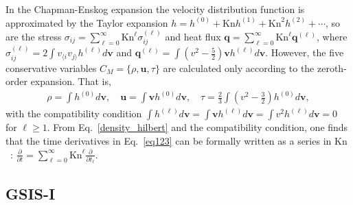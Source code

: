 \documentclass[onefignum,onetabnum]{siamart171218}
\begin{document}
In the Chapman-Enskog expansion the velocity distribution function is approximated by the Taylor expansion $h=h^{(0)}+\text{Kn}h^{(1)}+\text{Kn}^2h^{(2)}+\cdots$,
 so are the stress $\sigma_{ij} =\sum_{\ell=0}^\infty \text{Kn}^{\ell} \sigma_{ij}^{(\ell)}$ and heat flux $\bm{q} =\sum_{\ell=0}^\infty \text{Kn}^{\ell} \bm{q}^{(\ell)}$,
where $\sigma^{(\ell)}_{ij}=2\int{v_{\langle{i}}v_{j\rangle}h^{(\ell)}}d\bm{v}$ and
$\bm{q}^{(\ell)}=\int\left({v^2}-\frac{5}{2}\right)\bm{v}h^{(\ell)}d\bm{v}$. However, the five conservative variables $C_M=\{\rho,\bm{u}, \tau\}$  are calculated only according to the zeroth-order expansion. That is, 
\begin{eqnarray}\label{density_hilbert}
\rho=\int{}h^{(0)}d\bm{v}, \quad \bm{u}=\int{}\bm{v}h^{(0)}d\bm{v}, \quad \tau=\frac{2}{3}\int{}\left(v^2-\frac{3}{2}\right)h^{(0)}d\bm{v},
\end{eqnarray}
with the compatibility condition  $\int{}h^{(\ell)}d\bm{v}=\int{}\bm{v}h^{(\ell)}d\bm{v}=\int{}v^2h^{(\ell)}d\bm{v}=0$ for $\ell\ge1$.
From Eq.~\eqref{density_hilbert} and the compatibility condition, one finds that the time derivatives in Eq.~\eqref{eq123}  can be formally written as a series in $\text{Kn}$~\cite{henning}:
$\frac{\partial}{\partial{} t}=\sum_{\ell=0}^\infty \text{Kn}^{\ell} \frac{\partial}{\partial{} t_{\ell}}$.

%



\subsection{GSIS-I}
\end{document}
